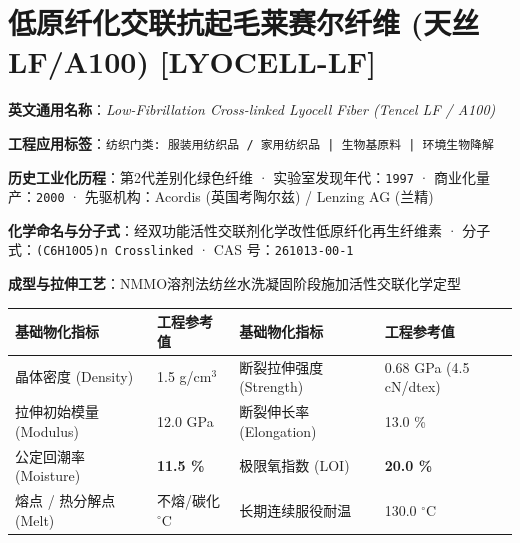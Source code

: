 \documentclass[11pt,openright,twoside,UTF8]{ctexbook}
\begin{document}
\section{低原纤化交联抗起毛莱赛尔纤维 (天丝LF/A100) [LYOCELL-LF]}
\label{sec:lyocell-lf}

\noindent\textbf{英文通用名称}：\textit{Low-Fibrillation Cross-linked Lyocell Fiber (Tencel LF / A100)}\par
\noindent\textbf{工程应用标签}：\texttt{纺织门类: 服装用纺织品 / 家用纺织品 | 生物基原料 | 环境生物降解}\par
\noindent\textbf{历史工业化历程}：第2代差别化绿色纤维 · 实验室发现年代：\texttt{1997} · 商业化量产：\texttt{2000} · 先驱机构：Acordis (英国考陶尔兹) / Lenzing AG (兰精)\par
\noindent\textbf{化学命名与分子式}：经双功能活性交联剂化学改性低原纤化再生纤维素 · 分子式：\texttt{(C6H10O5)n Crosslinked} · CAS 号：\texttt{261013-00-1}\par
\noindent\textbf{成型与拉伸工艺}：NMMO溶剂法纺丝水洗凝固阶段施加活性交联化学定型\par

\vspace{0.15cm}
\begin{center}
\small
\begin{tabularx}{\textwidth}{p{3.8cm}Xp{3.8cm}X}
\toprule
\textbf{基础物化指标} & \textbf{工程参考值} & \textbf{基础物化指标} & \textbf{工程参考值} \\
\midrule
晶体密度 (Density) & 1.5 g/cm$^3$ & 断裂拉伸强度 (Strength) & 0.68 GPa (4.5 cN/dtex) \\
拉伸初始模量 (Modulus) & 12.0 GPa & 断裂伸长率 (Elongation) & 13.0 \% \\
公定回潮率 (Moisture) & \textbf{11.5 \%} & 极限氧指数 (LOI) & \textbf{20.0 \%} \\
熔点 / 热分解点 (Melt) & 不熔/碳化 $^\circ\mathrm{C}$ & 长期连续服役耐温 & 130.0 $^\circ\mathrm{C}$ \\
\bottomrule
\end{tabularx}
\end{center}
\vspace{0.15cm}
\end{document}
